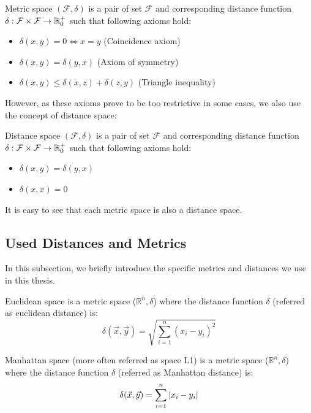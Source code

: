 \begin{defn}
Metric space $(\mathcal{F}, \delta)$ is a pair of set $\mathcal{F}$ and
corresponding distance function
$\delta : \mathcal{F} \times \mathcal{F} \rightarrow \mathbb{R}_0^+$ such that
following axioms hold:
\begin{itemize}
    \item $\delta(x, y) = 0 \Leftrightarrow x = y$ (Coincidence axiom)
    \item $\delta(x, y) = \delta(y, x)$ (Axiom of symmetry)
    \item $\delta(x, y) \leq \delta(x, z) + \delta(z, y)$ (Triangle inequality)
\end{itemize}
\end{defn}%

However, as these axioms prove to be too restrictive in some cases, we also use the concept of distance space:
\begin{defn}
Distance space $(\mathcal{F}, \delta)$ is a pair of set $\mathcal{F}$ and
corresponding distance function $\delta : \mathcal{F} \times \mathcal{F} \rightarrow \mathbb{R}_0^+$ such that
following axioms hold:
\begin{itemize}
    \item $\delta(x, y) = \delta(y, x)$
    \item $\delta(x, x) = 0$
\end{itemize}
\end{defn}%
It is easy to see that each metric space is also a distance space.

\subsection{Used Distances and Metrics}

\label{ssec:used_distances}

In this subsection, we briefly introduce the specific metrics and distances we use in this thesis.

\begin{defn}
Euclidean space is a metric space ($\mathbb{R}^n, \delta$) where the
distance function $\delta$ (referred as euclidean distance) is:
$$\delta(\vec{x}, \vec{y}) = \sqrt{\sum_{i=1}^n(x_i - y_i)^2}$$
\end{defn}

\begin{defn}
Manhattan space (more often referred as space L1) is a metric
space ($\mathbb{R}^n, \delta$) where the
distance function $\delta$ (referred as Manhattan distance) is:
$$\delta(\vec{x}, \vec{y}) = \sum_{i=1}^n \left|{x_i - y_i}\right|$$
\end{defn}

